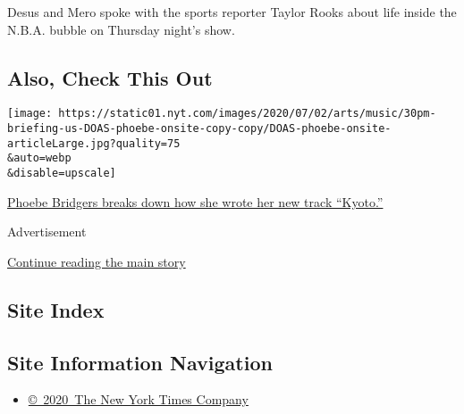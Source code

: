 Desus and Mero spoke with the sports reporter Taylor Rooks about life
inside the N.B.A. bubble on Thursday night's show.

\hypertarget{also-check-this-out}{%
\subsection{Also, Check This Out}\label{also-check-this-out}}

\texttt{[image: https://static01.nyt.com/images/2020/07/02/arts/music/30pm-briefing-us-DOAS-phoebe-onsite-copy-copy/DOAS-phoebe-onsite-articleLarge.jpg?quality=75\\\&auto=webp\\\&disable=upscale]}

\href{https://www.nytimes.com/2020/07/30/arts/music/phoebe-bridgers-kyoto.html}{Phoebe
Bridgers breaks down how she wrote her new track ``Kyoto.''}

Advertisement

\protect\hyperlink{after-bottom}{Continue reading the main story}

\hypertarget{site-index}{%
\subsection{Site Index}\label{site-index}}

\hypertarget{site-information-navigation}{%
\subsection{Site Information
Navigation}\label{site-information-navigation}}

\begin{itemize}
\tightlist
\item
  \href{https://help.nytimes.com/hc/en-us/articles/115014792127-Copyright-notice}{©~2020~The
  New York Times Company}
\end{itemize}

